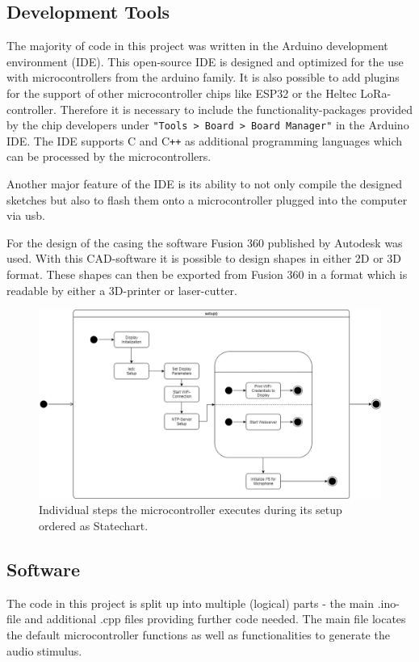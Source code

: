 \subsection{Development Tools}
The majority of code in this project was written in the Arduino development environment (IDE). 
This open-source IDE is designed and optimized for the use with microcontrollers from the arduino family.
It is also possible to add plugins for the support of other microcontroller chips like ESP32 or the Heltec LoRa-controller.
Therefore it is necessary to include the functionality-packages provided by the chip developers under \texttt{"Tools > Board > Board Manager"} in the Arduino IDE.
The IDE supports C and C\texttt{++} as additional programming languages which can be processed by the microcontrollers.

Another major feature of the IDE is its ability to not only compile the designed sketches but also to flash them onto a microcontroller plugged into the computer via usb.

For the design of the casing the software Fusion 360 published by Autodesk was used.
With this CAD-software it is possible to design shapes in either 2D or 3D format.
These shapes can then be exported from Fusion 360 in a format which is readable by either a 3D-printer or laser-cutter.
 

\begin{figure}[H]
	\includegraphics[width=\linewidth]{Media/Controller_setup.png}
	\caption{Individual steps the microcontroller executes during its setup ordered as Statechart.}
	\label{fig:cntrlr_stp}
\end{figure}

\subsection{Software}
The code in this project is split up into multiple (logical) parts - the main .ino-file and additional .cpp files providing further code needed.
The main file locates the default microcontroller functions as well as functionalities to generate the audio stimulus.

